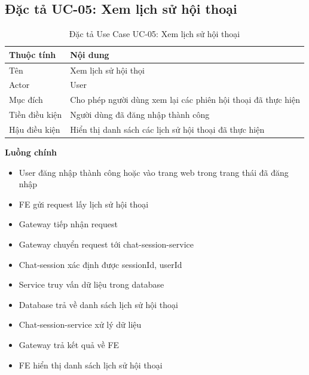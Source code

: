 \documentclass[../DoAn.tex]{subfiles}
\begin{document}
\newpage
\subsection{Đặc tả UC-05: Xem lịch sử hội thoại}
\begin{table}[htbp]
    \centering
    \renewcommand{\arraystretch}{1.6}
    \begin{tabular}{|l|p{10cm}|}
        \hline
        \textbf{Thuộc tính} & \textbf{Nội dung}                                            \\
        \hline
        Tên                 & Xem lịch sử hội thọi                                         \\
        \hline
        Actor               & User                                                         \\
        \hline
        Mục đích            & Cho phép người dùng xem lại các phiên hội thoại đã thực hiện \\
        \hline
        Tiền điều kiện      & Người dùng đã đăng nhập thành công                           \\
        \hline
        Hậu điều kiện       & Hiển thị danh sách các lịch sử hội thoại đã thực hiện        \\
        \hline
    \end{tabular}
    \caption{Đặc tả Use Case UC-05: Xem lịch sử hội thoại}
    \label{tab:usecase-chat-history}
\end{table}
\textbf{Luồng chính}
\begin{itemize}
    \item User đăng nhập thành công hoặc vào trang web trong trang thái đã đăng nhập
    \item FE gửi request lấy lịch sử hội thoại
    \item Gateway tiếp nhận request
    \item Gateway chuyển request tới chat-session-service
    \item Chat-session xác định được sessionId, userId
    \item Service truy vấn dữ liệu trong database
    \item Database trả về danh sách lịch sử hội thoại
    \item Chat-session-service xử lý dữ liệu
    \item Gateway trả kết quả về FE
    \item FE hiển thị danh sách lịch sử hội thoại
\end{itemize}
\clearpage
\end{document}
